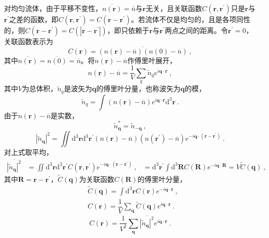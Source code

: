 \documentclass[11pt,a4paper]{article}
\renewcommand{\vec}[1]{\boldsymbol{#1}}
\newcommand{\dif}{\mathrm{d}}
\begin{document}
对均匀流体，由于平移不变性，$\overline{n(\vec{r})} = \bar{n}$与$\vec{r}$无关，且关联函数$C(\vec{r}, \vec{r}^\prime)$只是$\vec{r}$与$\vec{r}^\prime$之差的函数，即$C(\vec{r}, \vec{r}^\prime) = C(\vec{r} - \vec{r}^\prime)$。若流体不仅是均匀的，且是各项同性的，则$C(\vec{r} - \vec{r}^\prime) = C(|\vec{r} - \vec{r}^\prime|)$，即只依赖于$\vec{r}$与$\vec{r}^\prime$两点之间的距离。令$\vec{r}^\prime = 0$，关联函数表示为
\begin{equation}
C(\vec{r}) = \overline{(n(\vec{r}) -\overline{n} )(n(0) -\overline{n} )}  ~,
\end{equation}
其中$\overline{n(\vec{r})} = \overline{n(0)} = \overline{n}$。将$n(\vec{r}) - \overline{n}$作傅里叶展开，
\begin{equation}
n(\vec{r}) -\overline{n}  = \frac{1}{V} \sum_q \tilde{n}_q e^{i \vec{q}\cdot \vec{r}} ~,
\end{equation}
其中$V$为总体积，$\tilde{n}_q$是波矢为$\vec{q}$的傅里叶分量，也称波矢为$\vec{q}$的模，
\begin{equation}
\tilde{n}_q = \int (n(\vec{r}) -\overline{n} ) e^{i \vec{q}\cdot \vec{r}} \dif^3 \vec{r} ~.
\end{equation}
由于$n(\vec{r}) -\overline{n}$是实数，
\begin{equation}
\tilde{n}^\ast_{\vec{q}} = \tilde{n}_{-\vec{q}} ~,
\end{equation}
\begin{equation}
|\tilde{n}_{\vec{q}}|^2 = \iint \dif^3 \vec{r} \dif^3 \vec{r}^\prime (n(\vec{r}) -\overline{n} ) (n(\vec{r}^\prime) -\overline{n} ) e^{-i\vec{q}\cdot (\vec{r} - \vec{r}^\prime)} ~.
\end{equation}
对上式取平均，
\begin{align}
\overline{|\tilde{n}_{\vec{q}}|^2} &= \iint \dif^3 \vec{r} \dif^3 \vec{r}^\prime C(\vec{r}, \vec{r}^\prime) e^{-i\vec{q}\cdot (\vec{r} - \vec{r}^\prime)} ~, 
&= \dif^3 \vec{r}^\prime \int \dif^3 \vec{R} C( \vec{R}) e^{-i\vec{q}\cdot \vec{R}}  = V \tilde{C}(\vec{q}) ~,
\end{align}
其中$\vec{R} = \vec{r} - \vec{r}^\prime$，$\tilde{C}(\vec{q})$为关联函数$C(\vec{R})$的傅里叶分量，
\begin{align}
& \tilde{C}(\vec{q}) = \int \dif^3 \vec{r} C(\vec{r}) e^{-i\vec{q}\cdot \vec{r}} ~, \\
& C( \vec{r}) = \dfrac{1}{V} \sum_{\vec{q}} \tilde{C}(\vec{q}) e^{i\vec{q}\cdot \vec{r}} ~.
\end{align}
\begin{equation}
C( \vec{r}) =  \dfrac{1}{V^2} \sum_{\vec{q}} \overline{|\tilde{n}_{\vec{q}}|^2} e^{i\vec{q}\cdot \vec{r}} ~.
\end{equation}
\end{document}
